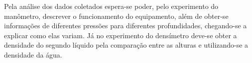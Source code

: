 
    Pela análise dos dados coletados espera-se poder, pelo experimento do
    manômetro, descrever o funcionamento do equipamento, além de obter-se
    informações de diferentes pressões para diferentes profundidades,
    chegando-se a explicar como elas variam. Já no experimento do densímetro
    deve-se obter a densidade do segundo líquido pela comparação entre as
    alturas e utilizando-se a densidade da água.

